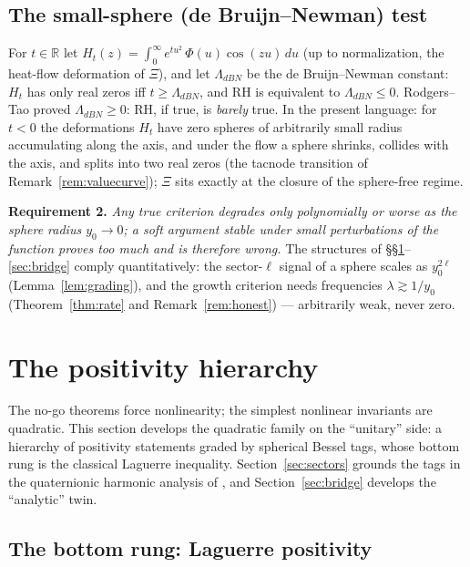 \documentclass[11pt]{amsart}
\theoremstyle{plain}
\theoremstyle{definition}
\theoremstyle{remark}
\newcommand{\RR}{\mathbb{R}}
\newcommand{\dd}{\,d}
\begin{document}
\subsection{The small-sphere (de Bruijn--Newman) test}\label{subsec:dBN}

For $t\in\RR$ let $H_t(z)=\int_0^\infty e^{tu^2}\,\Phi(u)\cos(zu)\dd u$ (up to normalization,
the heat-flow deformation of $\Xi$), and let $\Lambda_{dBN}$ be the de Bruijn--Newman constant:
$H_t$ has only real zeros iff $t\ge\Lambda_{dBN}$, and RH is equivalent to $\Lambda_{dBN}\le0$.
Rodgers--Tao \cite{RodgersTao2020} proved $\Lambda_{dBN}\ge0$: RH, if true, is \emph{barely}
true. In the present language: for $t<0$ the deformations $H_t$ have zero spheres of arbitrarily
small radius accumulating along the axis, and under the flow a sphere shrinks, collides with the
axis, and splits into two real zeros (the tacnode transition of Remark~\ref{rem:valuecurve});
$\Xi$ sits exactly at the closure of the sphere-free regime.

\textbf{Requirement 2.} \emph{Any true criterion degrades only polynomially or worse as the sphere
radius $y_0\to0$; a soft argument stable under small perturbations of the function proves too much
and is therefore wrong.} The structures of \S\S\ref{sec:positivity}--\ref{sec:bridge} comply
quantitatively: the sector-$\ell$ signal of a sphere scales as $y_0^{2\ell}$
(Lemma~\ref{lem:grading}), and the growth criterion needs frequencies $\lambda\gtrsim1/y_0$
(Theorem~\ref{thm:rate} and Remark~\ref{rem:honest}) --- arbitrarily weak, never zero.

\section{The positivity hierarchy}\label{sec:positivity}

The no-go theorems force nonlinearity; the simplest nonlinear invariants are quadratic. This
section develops the quadratic family on the ``unitary'' side: a hierarchy of positivity
statements graded by spherical Bessel tags, whose bottom rung is the classical Laguerre
inequality. Section~\ref{sec:sectors} grounds the tags in the quaternionic harmonic analysis of
\cite{Baker2015,Baker2016}, and Section~\ref{sec:bridge} develops the ``analytic'' twin.

\subsection{The bottom rung: Laguerre positivity}\label{subsec:laguerre}
\end{document}
